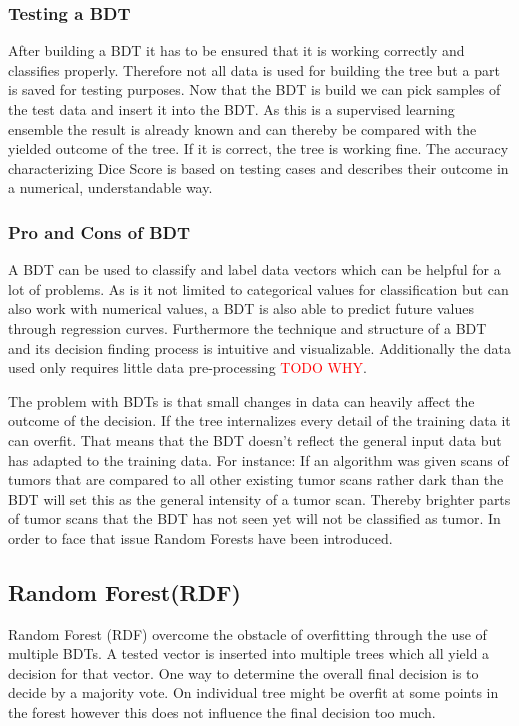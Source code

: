 \documentclass[
12pt,
headsepline,
bibliography=totoc,
twoside=semi,
fleqn
]{scrartcl}
\begin{document}
    \subsubsection{Testing a BDT\label{sec:sec2-1-4}}
      After building a BDT it has to be ensured that it is working correctly and classifies properly. Therefore not all data is used for building the tree but a part is saved for testing purposes. Now that the BDT is build we can pick samples of the test data and insert it into the BDT. As this is a supervised learning ensemble the result is already known and can thereby be compared with the yielded outcome of the tree. If it is correct, the tree is working fine. The accuracy characterizing Dice Score is based on testing cases and describes their outcome in a numerical, understandable way. 

    \subsubsection{Pro and Cons of BDT\label{sec:sec2-1-5}}
      A BDT can be used to classify and label data vectors which can be helpful for a lot of problems. As is it not limited to categorical values for classification but can also work with numerical values, a BDT is also able to predict future values through regression curves. Furthermore the technique and structure of a BDT and its decision finding process is intuitive and visualizable. Additionally the data used only requires little data pre-processing \textcolor{red}{TODO WHY}.

      The problem with BDTs is that small changes in data can heavily affect the outcome of the decision. If the tree internalizes every detail of the training data it can overfit. That means that the BDT doesn't reflect the general input data but has adapted to the training data. For instance: If an algorithm was given scans of tumors that are compared to all other existing tumor scans rather dark than the BDT will set this as the general intensity of a tumor scan. Thereby brighter parts of tumor scans that the BDT has not seen yet will not be classified as tumor. In order to face that issue Random Forests have been introduced.   

  \subsection{Random Forest(RDF)\label{sec:sec2-2}}
    Random Forest (RDF) overcome the obstacle of overfitting through the use of multiple BDTs. A tested vector is inserted into multiple trees which all yield a decision for that vector. One way to determine the overall final decision is to decide by a majority vote. On individual tree might be overfit at some points in the forest however this does not influence the final decision too much. 
\end{document}

